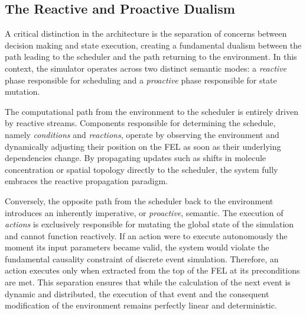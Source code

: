 \subsection{The Reactive and Proactive Dualism}
\label{ssec:reactive_proactive}
A critical distinction in the architecture is the separation of concerns
between decision making and state execution, creating a fundamental dualism
between the path leading to the scheduler and the path returning to the
environment. In this context, the simulator operates across two distinct
semantic modes: a \emph{reactive} phase responsible for scheduling and a
\emph{proactive} phase responsible for state mutation.

The computational path from the environment to the scheduler is entirely driven
by reactive streams. Components responsible for determining the schedule,
namely \emph{conditions} and \emph{reactions}, operate by observing the
environment and dynamically adjusting their position on the \ac{FEL} as soon as
their underlying dependencies change. By propagating updates such as shifts in
molecule concentration or spatial topology directly to the scheduler, the
system fully embraces the reactive propagation paradigm.

Conversely, the opposite path from the scheduler back to the environment
introduces an inherently imperative, or \emph{proactive}, semantic. The
execution of \emph{actions} is exclusively responsible for mutating the global
state of the simulation and cannot function reactively. If an action were to
execute autonomously the moment its input parameters became valid, the system
would violate the fundamental causality constraint of discrete event
simulation. Therefore, an action executes only when extracted from the top of
the \ac{FEL} at its preconditions are met.
%
%
This separation ensures that while the calculation of the next event is dynamic
and distributed, the execution of that event and the consequent modification of
the environment remains perfectly linear and deterministic.

